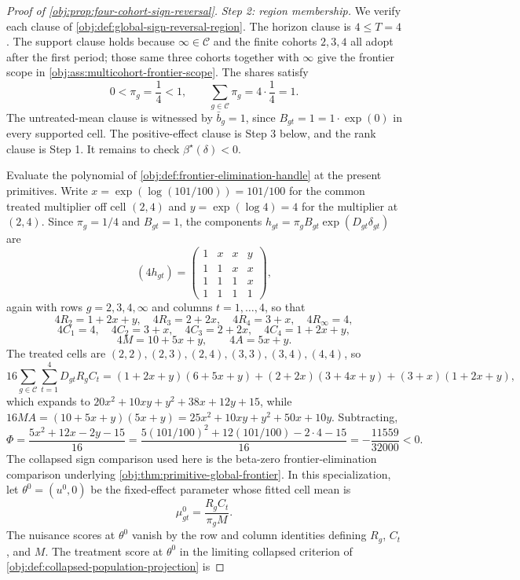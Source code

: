 \begin{proof}[Proof of \cref{obj:prop:four-cohort-sign-reversal}]
\textit{Step 2: region membership.} We verify each clause of \cref{obj:def:global-sign-reversal-region}. The horizon clause is \(4\le T=4\). The support clause holds because \(\infty\in\mathcal C\) and the finite cohorts \(2,3,4\) all adopt after the first period; those same three cohorts together with \(\infty\) give the frontier scope in \cref{obj:ass:multicohort-frontier-scope}. The shares satisfy
\[
0<\pi_g=\frac14<1,
\qquad
\sum_{g\in\mathcal C}\pi_g=4\cdot\frac14=1 .
\]
The untreated-mean clause is witnessed by \(\bar b_g=1\), since \(B_{gt}=1=1\cdot\exp(0)\) in every supported cell. The positive-effect clause is Step 3 below, and the rank clause is Step 1. It remains to check \(\beta^\star(\delta)<0\).

Evaluate the polynomial of \cref{obj:def:frontier-elimination-handle} at the present primitives. Write \(x=\exp(\log(101/100))=101/100\) for the common treated multiplier off cell \((2,4)\) and \(y=\exp(\log4)=4\) for the multiplier at \((2,4)\). Since \(\pi_g=1/4\) and \(B_{gt}=1\), the components \(h_{gt}=\pi_gB_{gt}\exp(D_{gt}\delta_{gt})\) are
\[
(4h_{gt})
=
\begin{pmatrix}
1&x&x&y\\
1&1&x&x\\
1&1&1&x\\
1&1&1&1
\end{pmatrix},
\]
again with rows \(g=2,3,4,\infty\) and columns \(t=1,\ldots,4\), so that
\[
4R_2=1+2x+y,\quad 4R_3=2+2x,\quad 4R_4=3+x,\quad 4R_\infty=4,
\]
\[
4C_1=4,\quad 4C_2=3+x,\quad 4C_3=2+2x,\quad 4C_4=1+2x+y,
\]
\[
4M=10+5x+y,
\qquad
4A=5x+y .
\]
The treated cells are \((2,2),(2,3),(2,4),(3,3),(3,4),(4,4)\), so
\[
16\sum_{g\in\mathcal C}\sum_{t=1}^4 D_{gt}R_gC_t
=
(1+2x+y)(6+5x+y)+(2+2x)(3+4x+y)+(3+x)(1+2x+y),
\]
which expands to \(20x^2+10xy+y^2+38x+12y+15\), while
\(16MA=(10+5x+y)(5x+y)=25x^2+10xy+y^2+50x+10y\). Subtracting,
\[
\Phi
=
\frac{5x^2+12x-2y-15}{16}
=
\frac{5(101/100)^2+12(101/100)-2\cdot4-15}{16}
=
-\frac{11559}{32000}
<0 .
\]
The collapsed sign comparison used here is the beta-zero frontier-elimination comparison underlying \cref{obj:thm:primitive-global-frontier}. In this specialization, let \(\theta^0=(u^0,0)\) be the fixed-effect parameter whose fitted cell mean is
\[
\mu^0_{gt}=\frac{R_gC_t}{\pi_gM} .
\]
The nuisance scores at \(\theta^0\) vanish by the row and column identities defining \(R_g\), \(C_t\), and \(M\). The treatment score at \(\theta^0\) in the limiting collapsed criterion of \cref{obj:def:collapsed-population-projection} is

\end{proof}
